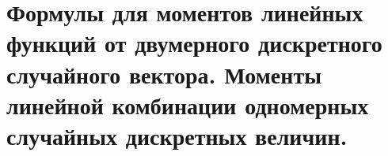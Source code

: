 \documentclass[polytech/stats/exam-2023/stats-exam-2023.tex]{subfiles}
\begin{document}
\section{Формулы для моментов линейных функций от двумерного дискретного случайного вектора. Моменты линейной комбинации одномерных случайных дискретных величин.}
\end{document}
